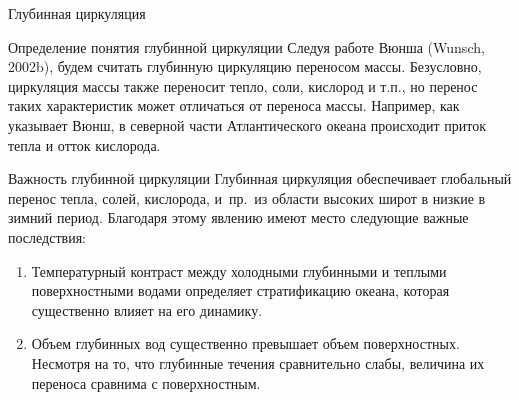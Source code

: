 \begin{chapter}{Глубинная циркуляция}
\begin{section}{Определение понятия глубинной циркуляции}
Следуя работе Вюнша (Wunsch, 2002b), будем считать глубинную циркуляцию
переносом массы. Безусловно, циркуляция массы также переносит тепло, соли,
кислород и т.п., но перенос таких характеристик может отличаться
от переноса массы. Например, как указывает Вюнш,
в северной части Атлантического океана происходит приток тепла и отток 
кислорода.
%
\end{section}
 
\begin{section}{Важность глубинной циркуляции}
%
%
Глубинная циркуляция обеспечивает глобальный перенос тепла, солей, 
кислорода, \COtwo{} и~пр.\ из области высоких широт в низкие в зимний 
период. Благодаря этому явлению имеют место следующие важные последствия:
%

\begin{enumerate}
\item 
Температурный контраст между холодными глубинными и теплыми поверхностными
водами определяет стратификацию океана, которая существенно влияет на его
динамику.
%

\item 
Объем глубинных вод существенно превышает объем поверхностных. Несмотря
на то, что глубинные течения сравнительно слабы, величина их 
переноса сравнима с поверхностным.
%


\end{enumerate}
\end{section}
\end{chapter}
